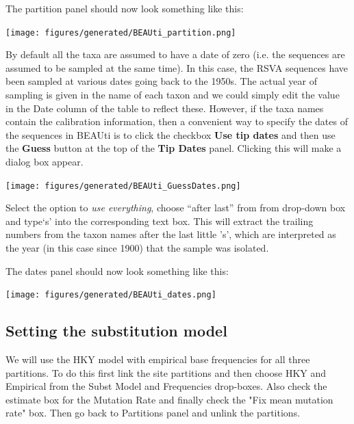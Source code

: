 \documentclass[12pt]{article}
\begin{document}
The partition panel should now look something like this:

\begin{center}
\texttt{[image: figures/generated/BEAUti\_partition.png]}
\end{center}

By default all the taxa are assumed to have a date of zero (i.e. the sequences are assumed to be sampled at the same time).
In this case, the RSVA sequences have been sampled at various dates going back to the 1950s. The actual year of sampling
is given in the name of each taxon and we could simply edit the value in the Date column of the table to reflect these.
However, if the taxa names contain the calibration information, then a convenient way to specify the dates of the sequences
in BEAUti is to click the checkbox {\bf Use tip dates} and then use the {\bf Guess} button at the top of the {\bf Tip Dates} panel. Clicking this will make a dialog box appear.

\medskip{}

\begin{center}
\texttt{[image: figures/generated/BEAUti\_GuessDates.png]}
\end{center}

\medskip{}

Select the option to {\it use everything}, choose ``after last'' from from drop-down box and type`s' into the corresponding text box. This will extract the trailing numbers from the taxon names after the last little 's', which are interpreted as the year (in this case since 1900) that the sample was isolated.

The dates panel should now look something like this:

\begin{center}
\texttt{[image: figures/generated/BEAUti\_dates.png]}
\end{center}


\subsection*{Setting the substitution model}
We will use the HKY model with empirical base frequencies for all three partitions. To do this first link the site partitions and then choose HKY and Empirical from the Subst Model and Frequencies drop-boxes. Also check the estimate box for the Mutation Rate and finally check the "Fix mean mutation rate" box. Then go back to Partitions panel and unlink the partitions.
\end{document}
